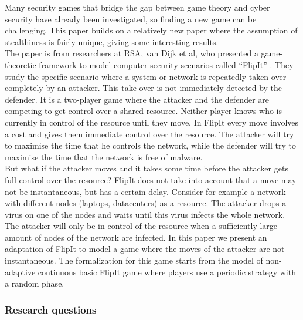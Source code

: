 Many security games that bridge the gap between game theory and cyber security have already been investigated, so finding a new game can be challenging. This paper builds on a relatively new paper where the assumption of stealthiness is fairly unique, giving some interesting results.\\ 
 The paper is from researchers at RSA, van Dijk et al,  who presented a game-theoretic framework to model computer security scenarios called ``FlipIt'' \cite{FlipIt}. They study the specific scenario where a system or network is repeatedly taken over completely by an attacker. This take-over is not immediately detected by the defender. It is a two-player game where the attacker and the defender are competing to get control over a shared resource. Neither player knows who is currently in control of the resource until they move. In FlipIt every move involves a cost and gives them immediate control over the resource. The attacker will try to maximise the time that he controls the network, while the defender will try to maximise the time that the network is free of malware. \\
 But what if the attacker moves and it takes some time before the attacker gets full control over the resource? FlipIt does not take into account that a move may not be instantaneous, but has a certain delay. Consider for example a network with different nodes (laptops, datacenters) as a resource. The attacker drops a virus on one of the nodes and waits until this virus infects the whole network. The attacker will only be in control of the resource when a sufficiently large amount of nodes of the network are infected. In this paper we present an adaptation of FlipIt to model a game where the moves of the attacker are not instantaneous. The formalization for this game starts from the model of non-adaptive continuous basic FlipIt game where players use a periodic strategy with a random phase.   \\

\subsubsection{Research questions}


